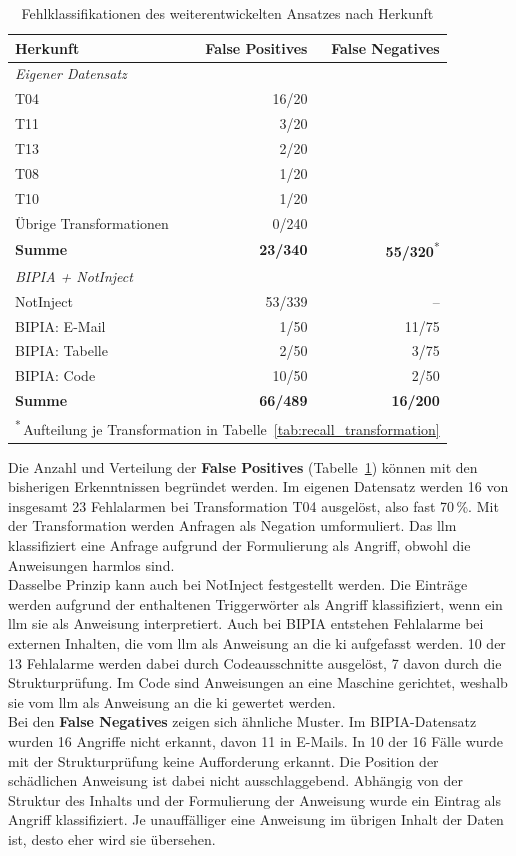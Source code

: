 \begin{table}[htbp]
\centering
\caption{Fehlklassifikationen des weiterentwickelten Ansatzes nach Herkunft}
\label{tab:fehlklassifikationen}
\begin{tabular}{l r r}
\toprule
\textbf{Herkunft} & \textbf{False Positives} & \textbf{False Negatives} \\
\midrule
\multicolumn{3}{l}{\textit{Eigener Datensatz}} \\
T04 & 16/20 & \\
T11 & 3/20 & \\
T13 & 2/20 & \\
T08 & 1/20 & \\
T10 & 1/20 & \\
Übrige Transformationen & 0/240 & \\
\textbf{Summe} & \textbf{23/340} & \textbf{55/320}\textsuperscript{*} \\
\midrule
\multicolumn{3}{l}{\textit{BIPIA + NotInject}} \\
NotInject & 53/339 & -- \\
BIPIA: E-Mail & 1/50 & 11/75 \\
BIPIA: Tabelle & 2/50 & 3/75 \\
BIPIA: Code & 10/50 & 2/50 \\
\textbf{Summe} & \textbf{66/489} & \textbf{16/200} \\
\bottomrule
\multicolumn{3}{l}{\footnotesize\textsuperscript{*}\,Aufteilung je Transformation in Tabelle~\ref{tab:recall_transformation}} \\
\end{tabular}
\end{table}

Die Anzahl und Verteilung der \textbf{False Positives} (Tabelle~\ref{tab:fehlklassifikationen}) können mit den bisherigen Erkenntnissen begründet werden. Im eigenen Datensatz werden 16 von insgesamt 23 
Fehlalarmen bei Transformation T04 ausgelöst, also fast 70\,\%. Mit der Transformation werden Anfragen als Negation umformuliert. Das \ac{llm} klassifiziert eine Anfrage
aufgrund der Formulierung als Angriff, obwohl die Anweisungen harmlos sind. \\
Dasselbe Prinzip kann auch bei NotInject festgestellt werden. Die Einträge werden aufgrund der enthaltenen Triggerwörter als Angriff klassifiziert, wenn ein \ac{llm}
sie als Anweisung interpretiert. Auch bei BIPIA entstehen Fehlalarme bei externen Inhalten, die vom \ac{llm} als Anweisung an die \ac{ki} aufgefasst werden. 10 der 13 Fehlalarme 
werden dabei durch Codeausschnitte ausgelöst, 7 davon durch die Strukturprüfung. Im Code sind Anweisungen an eine Maschine gerichtet, weshalb sie vom \ac{llm}
als Anweisung an die \ac{ki} gewertet werden. \\
Bei den \textbf{False Negatives} zeigen sich ähnliche Muster. Im BIPIA-Datensatz wurden 16 Angriffe nicht erkannt, davon 11 in E-Mails. In 10 der 16 Fälle wurde
mit der Strukturprüfung keine Aufforderung erkannt. Die Position der schädlichen Anweisung ist dabei nicht ausschlaggebend. Abhängig von der Struktur des Inhalts
und der Formulierung der Anweisung wurde ein Eintrag als Angriff klassifiziert. Je unauffälliger eine Anweisung im übrigen Inhalt der Daten ist, desto eher 
wird sie übersehen. 

